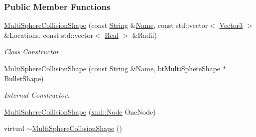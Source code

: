 \subsubsection*{Public Member Functions}
\begin{DoxyCompactItemize}
\item 
\hyperlink{classMezzanine_1_1MultiSphereCollisionShape_a51a5c4e42a736177c111e7ae6b319e39}{MultiSphereCollisionShape} (const \hyperlink{namespaceMezzanine_acf9fcc130e6ebf08e3d8491aebcf1c86}{String} \&\hyperlink{classMezzanine_1_1CollisionShape_aac524c5c56fa4d158bc071f8aecfbe79}{Name}, const std::vector$<$ \hyperlink{classMezzanine_1_1Vector3}{Vector3} $>$ \&Locations, const std::vector$<$ \hyperlink{namespaceMezzanine_a726731b1a7df72bf3583e4a97282c6f6}{Real} $>$ \&Radii)
\begin{DoxyCompactList}\small\item\em Class Constructor. \item\end{DoxyCompactList}\item 
\hyperlink{classMezzanine_1_1MultiSphereCollisionShape_aac4400d6c26ed1e9b5707d278d487c8f}{MultiSphereCollisionShape} (const \hyperlink{namespaceMezzanine_acf9fcc130e6ebf08e3d8491aebcf1c86}{String} \&\hyperlink{classMezzanine_1_1CollisionShape_aac524c5c56fa4d158bc071f8aecfbe79}{Name}, btMultiSphereShape $\ast$BulletShape)
\begin{DoxyCompactList}\small\item\em Internal Constructor. \item\end{DoxyCompactList}\item 
\hyperlink{classMezzanine_1_1MultiSphereCollisionShape_a7e5b54d6fa17acdd30b6194a0c68f0b0}{MultiSphereCollisionShape} (\hyperlink{classMezzanine_1_1xml_1_1Node}{xml::Node} OneNode)
\item 
\hypertarget{classMezzanine_1_1MultiSphereCollisionShape_a8a481bacb5aa02bfb21b3c7d9ca885de}{
virtual \hyperlink{classMezzanine_1_1MultiSphereCollisionShape_a8a481bacb5aa02bfb21b3c7d9ca885de}{$\sim$MultiSphereCollisionShape} ()}
\label{classMezzanine_1_1MultiSphereCollisionShape_a8a481bacb5aa02bfb21b3c7d9ca885de}


\end{DoxyCompactItemize}
